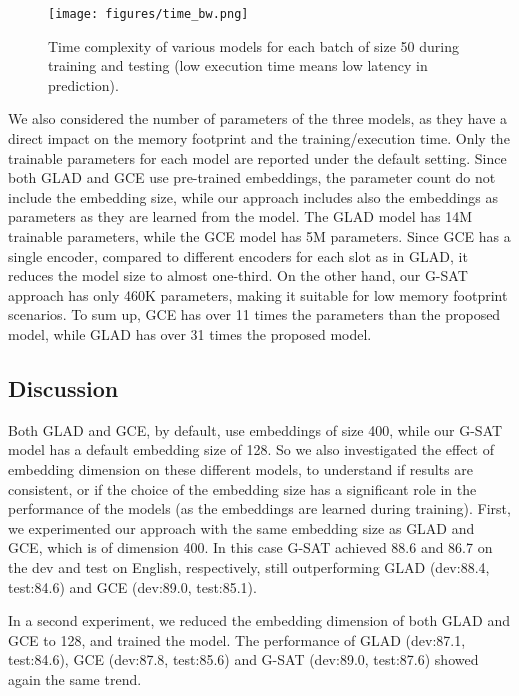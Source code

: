 \documentclass{article}
\begin{document}
\begin{figure}
    \centering
    \texttt{[image: figures/time\_bw.png]}
    \caption{Time complexity of various models for each batch of size 50 during training and testing (low execution time means low latency in prediction).}
    \label{fig:time}
\end{figure}

We also considered the number of parameters of the three models, as they have a direct impact on the memory footprint and the training/execution time.
Only the trainable parameters for each model are reported under the default setting.
Since both GLAD and GCE use pre-trained embeddings, the parameter count do not include the embedding size, while our approach includes also the embeddings as parameters as they are learned from the model.
The GLAD model has 14M trainable parameters, while the GCE model has 5M parameters.
Since GCE has a single encoder, compared to different encoders for each slot as in GLAD, it reduces the model size to almost one-third.
On the other hand, our G-SAT approach has only 460K parameters, making it suitable for low memory footprint scenarios. To sum up, GCE  has over 11 times the  parameters than the proposed model, while GLAD has over 31 times the proposed model.

\subsection{Discussion}
Both GLAD and GCE, by default, use  embeddings of size 400, while our G-SAT model has a default embedding size of 128.
So we also investigated the effect of embedding dimension on these different models, to understand if  results are consistent, or if the choice of the embedding size has a significant role in the performance of the models (as the embeddings are learned during training).
First, we experimented our approach with the same embedding size as GLAD and GCE, which is of dimension 400.
In this case G-SAT achieved 88.6 and 86.7 on the dev and test on English, respectively, still outperforming GLAD (dev:88.4, test:84.6) and GCE (dev:89.0, test:85.1).

In a second experiment, we reduced the embedding dimension of both GLAD and GCE to 128, and trained the model.
The performance of GLAD (dev:87.1, test:84.6), GCE (dev:87.8, test:85.6) and G-SAT (dev:89.0, test:87.6) showed again the same trend.
\end{document}
